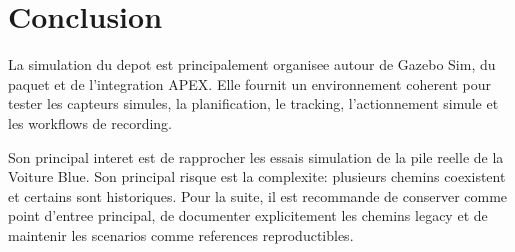 \section{Conclusion}

La simulation du depot est principalement organisee autour de Gazebo Sim, du paquet  et de l'integration APEX. Elle fournit un environnement coherent pour tester les capteurs simules, la planification, le tracking, l'actionnement simule et les workflows de recording.

Son principal interet est de rapprocher les essais simulation de la pile reelle de la Voiture Blue. Son principal risque est la complexite: plusieurs chemins coexistent et certains sont historiques. Pour la suite, il est recommande de conserver  comme point d'entree principal, de documenter explicitement les chemins legacy et de maintenir les scenarios comme references reproductibles.

